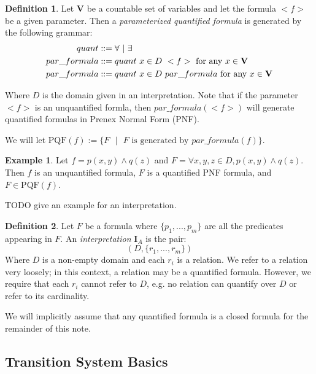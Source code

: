 \documentclass[12pt]{article}
\theoremstyle{definition}
\newtheorem{definition}{Definition}
\newtheorem{example}{Example}
\theoremstyle{remark}
\newcommand{\msp}{\text{ }}
\newcommand{\st}{\text{ }|\text{ }}
\newcommand{\PQF}{\text{PQF}}
\begin{document}
\begin{definition}
  Let $\mathbf{V}$ be a countable set of variables and let the formula $<f>$ be a given parameter.  Then a \textit{parameterized quantified formula} is generated by the following grammar:
  \begin{align*}
    quant &::= \forall \st \exists\\
    par\_formula &::= quant \msp x \in D \msp <f> \hfill \text{ for any } x \in \mathbf{V}\\
    par\_formula &::= quant \msp x \in D \msp par\_formula \hfill \text{ for any } x \in \mathbf{V}\\
  \end{align*}

  Where $D$ is the domain given in an interpretation.  Note that if the parameter $<f>$ is an unquantified formla, then $par\_formula(<f>)$ will generate quantified formulas in Prenex Normal Form (PNF).

  We will let $\PQF(f) := \{F \st F \text{ is generated by } par\_formula(f)\}$.

\end{definition}

\begin{example}
  Let $f = p(x,y) \land q(z)$ and $F = \forall x,y,z \in D, p(x,y) \land q(z)$.  Then $f$ is an unquantified formula, $F$ is a quantified PNF formula, and $F \in \PQF(f)$.

  TODO give an example for an interpretation.
\end{example}

\begin{definition}
  Let $F$ be a formula where $\{p_1,...,p_m\}$ are all the predicates appearing in $F$.  An \textit{interpretation} $\mathbf{I}_A$ is the pair:
  $$(D, \{r_1,...,r_m\})$$
  Where $D$ is a non-empty domain and each $r_i$ is a relation.  We refer to a relation very loosely; in this context, a relation may be a quantified formula.  However, we require that each $r_i$ cannot refer to $D$, e.g. no relation can quantify over $D$ or refer to its cardinality.
\end{definition}

We will implicitly assume that any quantified formula is a closed formula for the remainder of this note.


\subsection{Transition System Basics}
\end{document}

